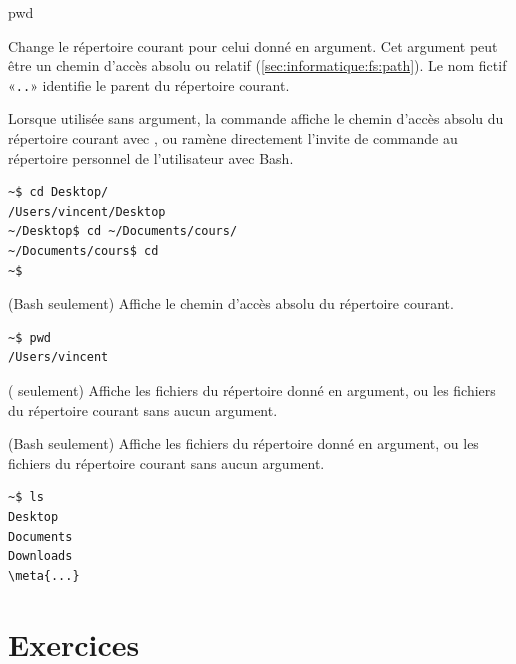 \begin{ttscript}{pwd}
\item[\Icode{cd}] Change le répertoire courant pour
  celui donné en argument. Cet argument peut être un chemin d'accès
  absolu ou relatif (\autoref{sec:informatique:fs:path}). Le nom
  fictif «\verb=..=» identifie le parent du répertoire courant.

  Lorsque utilisée sans argument, la commande affiche le chemin
  d'accès absolu du répertoire courant avec , ou ramène
  directement l'invite de commande au répertoire personnel de
  l'utilisateur avec Bash.
  \begin{Schunk}
\begin{Verbatim}
~$ cd Desktop/
/Users/vincent/Desktop
~/Desktop$ cd ~/Documents/cours/
~/Documents/cours$ cd
~$
\end{Verbatim}
  \end{Schunk}
\item[\Icode{pwd}] (Bash seulement) Affiche le chemin
  d'accès absolu du répertoire courant.
  \begin{Schunk}
\begin{Verbatim}
~$ pwd
/Users/vincent
\end{Verbatim}
  \end{Schunk} %
\item[\Icode{dir}] (
  seulement) Affiche les fichiers du répertoire donné en argument, ou
  les fichiers du répertoire courant sans aucun argument.
\item[\code{ls}]  (Bash
  seulement) Affiche les fichiers du répertoire donné en argument, ou
  les fichiers du répertoire courant sans aucun argument.
  \begin{Schunk}
\begin{Verbatim}[commandchars=\\\{\}]
~$ ls
Desktop
Documents
Downloads
\meta{...}
\end{Verbatim}
  \end{Schunk} %
\end{ttscript}


\section{Exercices}
\label{operateurs:exercices}

